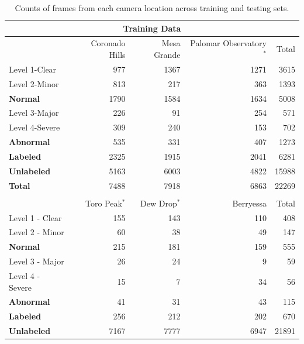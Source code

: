 \documentclass[remotesensing,article,submit,moreauthors]{Definitions/mdpi}
\begin{document}
\begin{table}[H]
\scriptsize
\centering
\begin{threeparttable}

\caption{Counts of frames from each camera location across training and testing sets.}
\label{tab:frame_counts}

\begin{tabular}{@{}lrrrr@{}}
\toprule
\multicolumn{5}{c}{\textbf{Training Data}} \\
\midrule
& Coronado Hills & Mesa Grande & Palomar Observatory$^{*}$ & Total \\
\midrule

Level 1-Clear  & 977  & 1367 & 1271 & 3615 \\
Level 2-Minor  & 813  & 217  & 363  & 1393 \\
\textbf{Normal}  & 1790 & 1584 & 1634 & 5008 \\

\midrule
Level 3-Major  & 226  & 91  & 254  & 571 \\
Level 4-Severe & 309  & 240 & 153  & 702 \\
\textbf{Abnormal}& 535  & 331  & 407  & 1273 \\

\midrule
\textbf{Labeled}   & 2325 & 1915 & 2041 & 6281 \\
\textbf{Unlabeled} & 5163 & 6003 & 4822 & 15988 \\

\midrule
\textbf{Total} & 7488 & 7918 & 6863 & 22269 \\
\bottomrule

\addlinespace[0.5em]

\toprule
\multicolumn{5}{c}{\textbf{Testing Data}} \\
\midrule
& Toro Peak$^{*}$ & Dew Drop$^{*}$ & Berryessa & Total \\
\midrule

Level 1 - Clear  & 155 & 143 & 110 & 408 \\
Level 2 - Minor  & 60  & 38  & 49  & 147 \\
\textbf{Normal}  & 215 & 181 & 159 & 555 \\

\midrule
Level 3 - Major  & 26 & 24 & 9 & 59 \\
Level 4 - Severe & 15 & 7 & 34 & 56 \\
\textbf{Abnormal}& 41 & 31 & 43 & 115 \\

\midrule
\textbf{Labeled}   & 256 & 212 & 202 & 670 \\
\textbf{Unlabeled} & 7167 & 7777 & 6947 & 21891 \\


\end{tabular}
\end{threeparttable}
\end{table}
\end{document}
